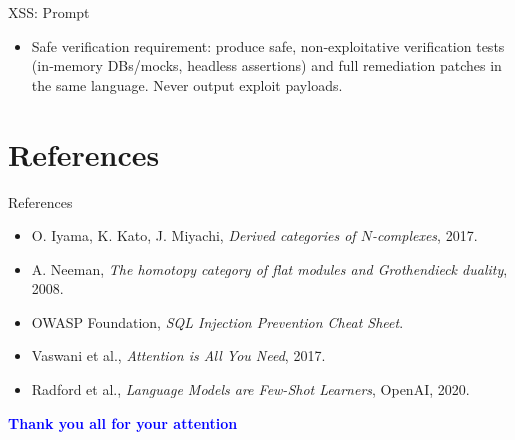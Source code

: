 \documentclass[t,ignorenonframetext]{beamer}
\begin{document}
\begin{frame}{XSS: Prompt}
\begin{tcolorbox}
[colback=blue!5!white,colframe=navy!75!black,title=Tasks (Part 3)]
\begin{itemize}
\item Safe verification requirement: produce safe, non‑exploitative verification tests 
   (in‑memory DBs/mocks, headless assertions) and full remediation patches in the same language. Never output exploit payloads.
\end{itemize}
\end{tcolorbox}
\end{frame} 

\section{References}
\begin{frame}{References}
\tiny
\begin{itemize}
\item O. Iyama, K. Kato, J. Miyachi, \textit{Derived categories of $N$-complexes}, 2017.
\item A. Neeman, \textit{The homotopy category of flat modules and Grothendieck duality}, 2008.
\item OWASP Foundation, \textit{SQL Injection Prevention Cheat Sheet}.
\item Vaswani et al., \textit{Attention is All You Need}, 2017.
\item Radford et al., \textit{Language Models are Few-Shot Learners}, OpenAI, 2020.
\end{itemize}
\end{frame}

\begin{frame}
\vspace{3cm}
\begin{center}
\begin{LARGE}
\textcolor{blue}{\textbf{Thank you all for your attention}}
\end{LARGE}
\end{center}
\end{frame}
\end{document}
